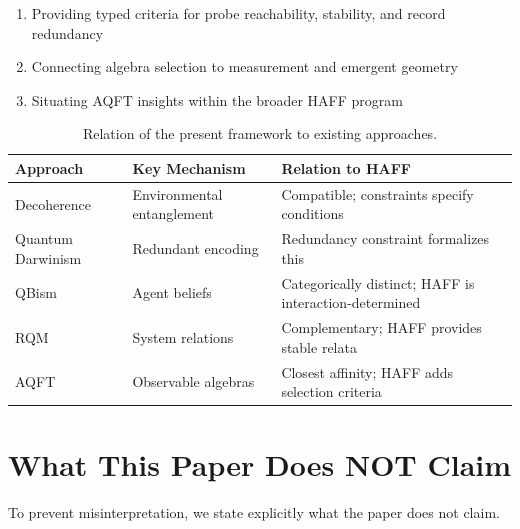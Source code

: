 \documentclass[12pt,a4paper,openany]{book}
\begin{document}
\begin{enumerate}
    \item Providing typed criteria for probe reachability, stability, and record redundancy
    \item Connecting algebra selection to measurement and emergent geometry
    \item Situating AQFT insights within the broader HAFF program
\end{enumerate}

\begin{table}[ht]
\centering
\small
\begin{tabular}{|P{3cm}|P{4cm}|P{5.5cm}|}
\hline
\textbf{Approach} & \textbf{Key Mechanism} & \textbf{Relation to HAFF} \\
\hline
Decoherence & Environmental entanglement & Compatible; constraints specify conditions \\
\hline
Quantum Darwinism & Redundant encoding & Redundancy constraint formalizes this \\
\hline
QBism & Agent beliefs & Categorically distinct; HAFF is interaction-determined \\
\hline
RQM & System relations & Complementary; HAFF provides stable relata \\
\hline
AQFT & Observable algebras & Closest affinity; HAFF adds selection criteria \\
\hline
\end{tabular}
\caption{Relation of the present framework to existing approaches.}
\label{E-tab:relations}
\end{table}

\section{What This Paper Does NOT Claim}
\label{E-sec:nonclaims}

To prevent misinterpretation, we state explicitly what the paper does not claim.
\end{document}
